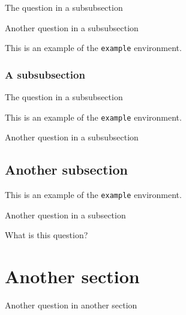 \documentclass{scrartcl}
\begin{document}
\begin{question}
The question in a subsubsection
\end{question}

\begin{question}
Another question in a subsubsection
\end{question}

\begin{example}
    This is an example of the \texttt{example} environment.
\end{example}

\subsubsection{A subsubsection}

\begin{question}
The question in a subsubsection
\end{question}

\begin{example}
    This is an example of the \texttt{example} environment.
\end{example}

\begin{question}
Another question in a subsubsection
\end{question}

\subsection{Another subsection}

\begin{example}
    This is an example of the \texttt{example} environment.
\end{example}

\begin{question}
Another question in a subsection
\end{question}

\begin{question}
What is this question?
\end{question}

\section{Another section}

\begin{question}
Another question in another section
\end{question}
\end{document}
